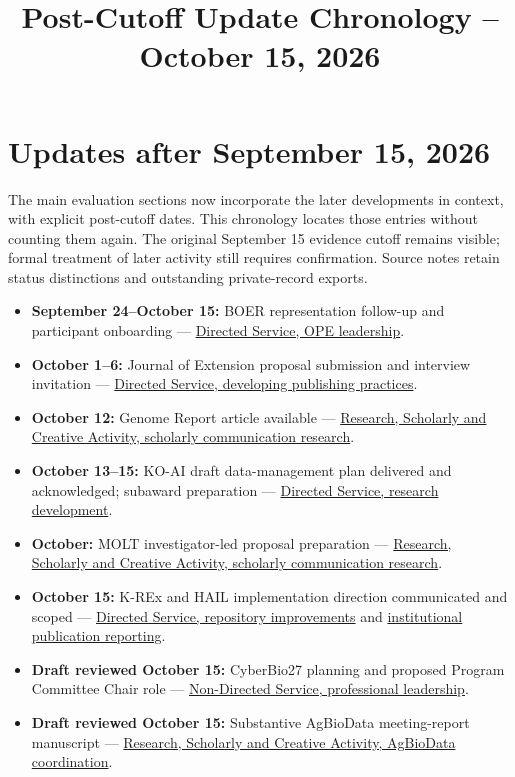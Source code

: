 \title{Post-Cutoff Update Chronology -- October 15, 2026}
\portfoliotitle
\section{Updates after September 15, 2026}
The main evaluation sections now incorporate the later developments in context,
with explicit post-cutoff dates. This chronology locates those entries without
counting them again. The original September 15 evidence cutoff remains visible;
formal treatment of later activity still requires confirmation. Source notes
retain status distinctions and outstanding private-record exports.

\begin{itemize}
\item \textbf{September 24--October 15:} BOER representation follow-up and participant onboarding --- \hyperref[update-boer]{Directed Service, OPE leadership}.
\item \textbf{October 1--6:} Journal of Extension proposal submission and interview invitation --- \hyperref[update-joe]{Directed Service, developing publishing practices}.
\item \textbf{October 12:} Genome Report article available --- \hyperref[update-genomereport]{Research, Scholarly and Creative Activity, scholarly communication research}.
\item \textbf{October 13--15:} KO-AI draft data-management plan delivered and acknowledged; subaward preparation --- \hyperref[update-koai]{Directed Service, research development}.
\item \textbf{October:} MOLT investigator-led proposal preparation --- \hyperref[update-molt]{Research, Scholarly and Creative Activity, scholarly communication research}.
\item \textbf{October 15:} K-REx and HAIL implementation direction communicated and scoped --- \hyperref[update-krex]{Directed Service, repository improvements} and \hyperref[update-hail]{institutional publication reporting}.
\item \textbf{Draft reviewed October 15:} CyberBio27 planning and proposed Program Committee Chair role --- \hyperref[update-cyberbio]{Non-Directed Service, professional leadership}.
\item \textbf{Draft reviewed October 15:} Substantive AgBioData meeting-report manuscript --- \hyperref[update-agbiodata]{Research, Scholarly and Creative Activity, AgBioData coordination}.
\end{itemize}
